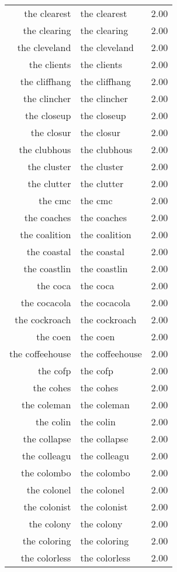 \begin{table}[ht]
\begin{tabular}{rlr}
  the clearest & the clearest & 2.00 \\ 
  the clearing & the clearing & 2.00 \\ 
  the cleveland & the cleveland & 2.00 \\ 
  the clients & the clients & 2.00 \\ 
  the cliffhang & the cliffhang & 2.00 \\ 
  the clincher & the clincher & 2.00 \\ 
  the closeup & the closeup & 2.00 \\ 
  the closur & the closur & 2.00 \\ 
  the clubhous & the clubhous & 2.00 \\ 
  the cluster & the cluster & 2.00 \\ 
  the clutter & the clutter & 2.00 \\ 
  the cmc & the cmc & 2.00 \\ 
  the coaches & the coaches & 2.00 \\ 
  the coalition & the coalition & 2.00 \\ 
  the coastal & the coastal & 2.00 \\ 
  the coastlin & the coastlin & 2.00 \\ 
  the coca & the coca & 2.00 \\ 
  the cocacola & the cocacola & 2.00 \\ 
  the cockroach & the cockroach & 2.00 \\ 
  the coen & the coen & 2.00 \\ 
  the coffeehouse & the coffeehouse & 2.00 \\ 
  the cofp & the cofp & 2.00 \\ 
  the cohes & the cohes & 2.00 \\ 
  the coleman & the coleman & 2.00 \\ 
  the colin & the colin & 2.00 \\ 
  the collapse & the collapse & 2.00 \\ 
  the colleagu & the colleagu & 2.00 \\ 
  the colombo & the colombo & 2.00 \\ 
  the colonel & the colonel & 2.00 \\ 
  the colonist & the colonist & 2.00 \\ 
  the colony & the colony & 2.00 \\ 
  the coloring & the coloring & 2.00 \\ 
  the colorless & the colorless & 2.00 \\ 

\end{tabular}
\end{table}
